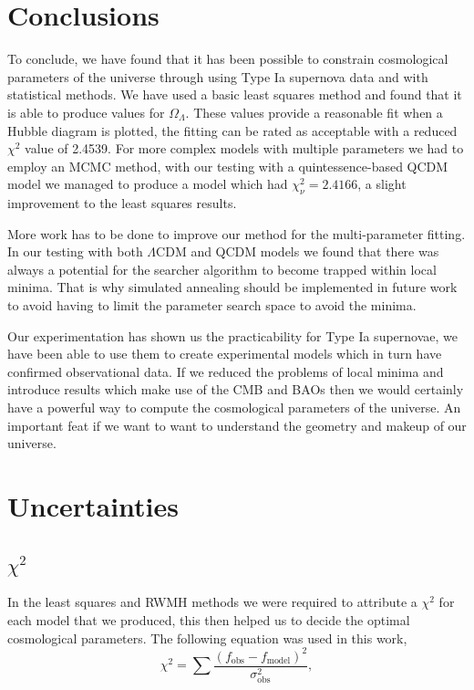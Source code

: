 \documentclass[twocolumn]{revtex4}
\begin{document}
{{{\vspace{-3ex}
\section{Conclusions}
\vspace{-2ex}
To conclude, we have found that it has been possible to constrain cosmological parameters of the universe through using Type Ia supernova data and with statistical methods. We have used a basic least squares method and found that it is able to produce values for $\Omega_\Lambda$. These values provide a reasonable fit when a Hubble diagram is plotted, the fitting can be rated as acceptable with a reduced $\chi^2$ value of 2.4539. For more complex models with multiple parameters we had to employ an MCMC method, with our testing with a quintessence-based QCDM model we managed to produce a model which had $\chi^2_\nu=2.4166$, a slight improvement to the least squares results.

More work has to be done to improve our method for the multi-parameter fitting. In our testing with both $\Lambda$CDM and QCDM models we found that there was always a potential for the searcher algorithm to become trapped within local minima. That is why simulated annealing should be implemented in future work to avoid having to limit the parameter search space to avoid the minima. 

Our experimentation has shown us the practicability for Type Ia supernovae, we have been able to use them to create experimental models which in turn have confirmed observational data. If we reduced the problems of local minima and introduce results which make use of the CMB and BAOs then we would certainly have a powerful way to compute the cosmological parameters of the universe. An important feat if we want to want to understand the geometry and makeup of our universe.

\vspace{-3ex}



\clearpage
\appendix

\vfill
\twocolumngrid
\vspace{-3ex}
\section{Uncertainties}
\vspace{-2ex}
\subsection{$\chi^2$}
\vspace{-2ex}
In the least squares and RWMH methods we were required to attribute a $\chi^2$ for each model that we produced, this then helped us to decide the optimal cosmological parameters. The following equation was used in this work, 
\begin{equation}
\chi^2 = \sum \frac{(f_\text{obs}-f_\text{model})^2}{\sigma_\text{obs}^2},
\end{equation}

}}}
\end{document}
